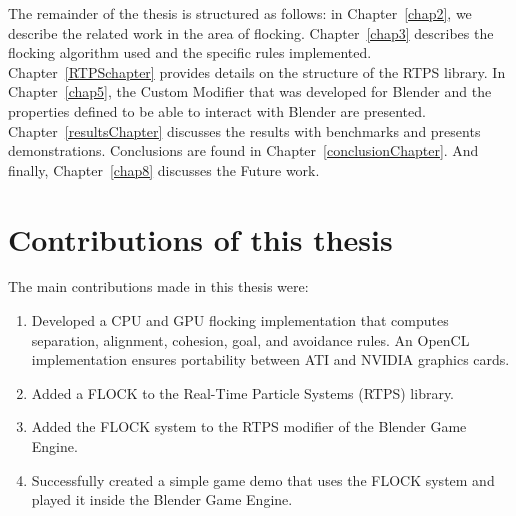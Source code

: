 
The remainder of the thesis is structured as follows:  in Chapter~\ref{chap2}, we describe the related work in the area of flocking. Chapter~\ref{chap3} describes the flocking algorithm used and the specific rules implemented. Chapter~\ref{RTPSchapter} provides details on the structure of the RTPS library. In Chapter~\ref{chap5}, the Custom Modifier that was developed for Blender and the properties defined to be able to interact with Blender are presented. Chapter~\ref{resultsChapter} discusses the results with benchmarks and presents demonstrations. Conclusions are found in Chapter~\ref{conclusionChapter}.  And finally, Chapter~\ref{chap8} discusses the Future work. 

\section{Contributions of this thesis}
The main contributions made in this thesis were:
\begin{enumerate}
\item Developed a CPU and GPU flocking implementation that computes separation, alignment, cohesion, goal, and avoidance rules. An OpenCL implementation ensures portability between ATI and NVIDIA graphics cards.
\item Added a FLOCK to the Real-Time Particle Systems (RTPS) library.
\item Added the FLOCK system to the RTPS modifier of the Blender Game Engine.
\item Successfully created a simple game demo that uses the FLOCK system and played it inside the Blender Game Engine.
\end{enumerate}
